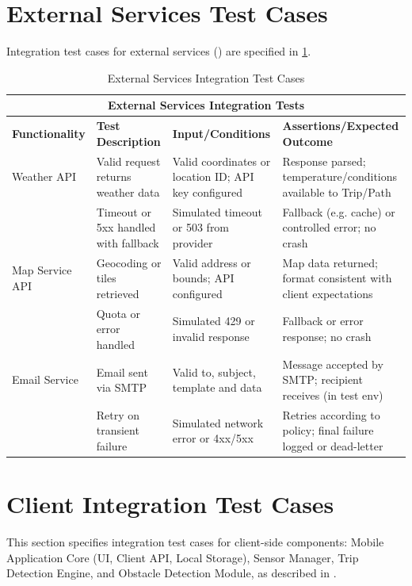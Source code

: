 \section{External Services Test Cases}
\label{sec:external_services_test_cases}%

Integration test cases for external services () are specified in \cref{tab:test_cases_external_services}.

\begin{table}[ht]
\centering
\begin{tabular}{|p{3.2cm}|p{3.8cm}|p{3.2cm}|p{4.8cm}|}
\hline
\multicolumn{4}{|c|}{\textbf{External Services Integration Tests}} \\ 
\hline
\textbf{Functionality} & \textbf{Test Description} & \textbf{Input/Conditions} & \textbf{Assertions/Expected Outcome} \\
\hline
Weather API
 & Valid request returns weather data
 & Valid coordinates or location ID; API key configured
 & Response parsed; temperature/conditions available to Trip/Path \\ \hline
 & Timeout or 5xx handled with fallback
 & Simulated timeout or 503 from provider
 & Fallback (e.g. cache) or controlled error; no crash \\ \hline
Map Service API
 & Geocoding or tiles retrieved
 & Valid address or bounds; API configured
 & Map data returned; format consistent with client expectations \\ \hline
 & Quota or error handled
 & Simulated 429 or invalid response
 & Fallback or error response; no crash \\ \hline
Email Service
 & Email sent via SMTP
 & Valid to, subject, template and data
 & Message accepted by SMTP; recipient receives (in test env) \\ \hline
 & Retry on transient failure
 & Simulated network error or 4xx/5xx
 & Retries according to policy; final failure logged or dead-letter \\ \hline
\end{tabular}
\caption{External Services Integration Test Cases}
\label{tab:test_cases_external_services}
\end{table}

\section{Client Integration Test Cases}
\label{sec:client_integration_test_cases}%

This section specifies integration test cases for client-side components: Mobile Application Core (UI, Client API, Local Storage), Sensor Manager, Trip Detection Engine, and Obstacle Detection Module, as described in .

